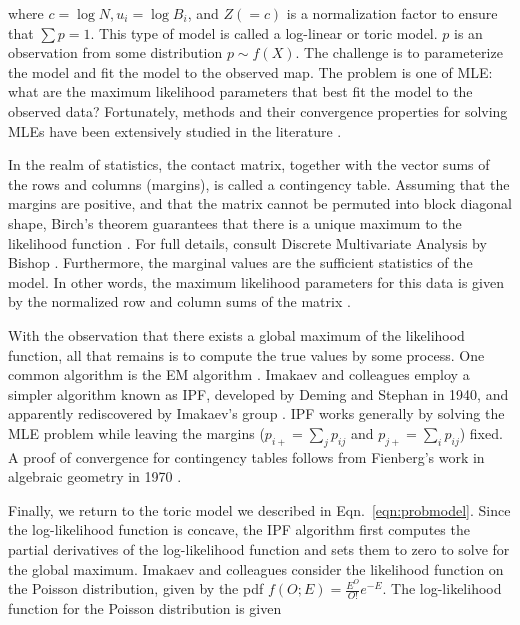 where $c = \log{N}, u_i = \log{B_i}$, and $Z (= c)$ is a normalization factor to ensure that $\sum p = 1$.  This type of
model is called a \gls{log-linear} or \gls{toric model}.  $p$ is an observation from some distribution $p \sim f(X)$.  The challenge is to
parameterize the model and fit the model to the observed map.  The problem is one of \gls{MLE}: what are the maximum likelihood parameters
that best fit the model to the observed data?  Fortunately, methods and their convergence properties for solving \glspl{MLE} have been extensively
studied in the literature \citep{pachter2005,fienberg2012}.

In the realm of statistics, the contact matrix, together with the vector sums of the rows and columns (margins), is called a \gls{contingency table}.  Assuming
that the margins are positive, and that the matrix cannot be permuted into block diagonal shape, Birch's theorem guarantees that there is a
unique maximum to the likelihood function \citep{bishop1975, pachter2005}.  For full details, consult Discrete Multivariate Analysis by
Bishop \citep{bishop1975}.  Furthermore, the marginal values are the \glspl{sufficient statistic} of the model.  In other words, the maximum
likelihood parameters for this data is given by the normalized row and column sums of the matrix \citep{pachter2005}.

With the observation that there exists a global maximum of the likelihood function, all that remains is to compute the true values by some
process.  One common algorithm is the \gls{EM} algorithm \citep{fuchs1982}.  Imakaev and colleagues employ a simpler algorithm known as \gls{IPF},
developed by Deming and Stephan in 1940, and apparently rediscovered by Imakaev's group \citep{deming1940}.  \gls{IPF} works generally by solving
the \gls{MLE} problem while leaving the margins ($p_{i+} = \sum_{j}p_{ij}$ and $p_{j+} = \sum_{i}p_{ij}$) fixed.  A proof of convergence for contingency
tables follows from Fienberg's work in algebraic geometry in 1970 \citep{fienberg1970}.

Finally, we return to the \gls{toric model} we described in Eqn.~\eqref{eqn:probmodel}.  Since the log-likelihood function is concave, the \gls{IPF}
algorithm first computes the partial derivatives of the log-likelihood function and sets them to zero to solve for the global maximum.  Imakaev
and colleagues consider the likelihood function on the Poisson distribution, given by the \gls{pdf} $f(O;E) = \frac{E^{O}}{O!}e^{-E}$.  The
log-likelihood function for the Poisson distribution is given

